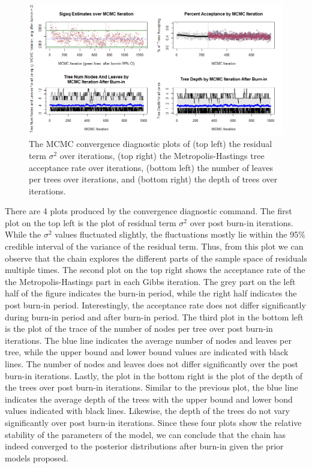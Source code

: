 \documentclass{usiinftr}
\begin{document}
\begin{figure}[h!] 
\centering
\includegraphics[width=\textwidth]{images/MCMC_convergence.png}
\caption{The MCMC convergence diagnostic plots of (top left) the residual term $\sigma^2$ over iterations, (top right) the Metropolis-Hastings tree acceptance rate over iterations, (bottom left) the number of leaves per trees over iterations, and (bottom right) the depth of trees over iterations.}
\label{MCMCConv}
\end{figure}

There are 4 plots produced by the convergence diagnostic command. The first plot on the top left is the plot of residual term $\sigma^2$ over post burn-in iterations. While the $\sigma^2$ values fluctuated slightly, the fluctuations mostly lie within the 95\% credible interval of the variance of the residual term. Thus, from this plot we can observe that the chain explores the different parts of the sample space of residuals multiple times. The second plot on the top right shows the acceptance rate of the the Metropolis-Hastings part in each Gibbs iteration. The grey part on the left half of the figure indicates the burn-in period, while the right half indicates the post burn-in period. Interestingly, the acceptance rate does not differ significantly during burn-in period and after burn-in period. The third plot in the bottom left is the plot of the trace of the number of nodes per tree over post burn-in iterations. The blue line indicates the average number of nodes and leaves per tree, while the upper bound and lower bound values are indicated with black lines. The number of nodes and leaves does not differ significantly over the post burn-in iterations. Lastly, the plot in the bottom right is the plot of the depth of the trees over post burn-in iterations. Similar to the previous plot, the blue line indicates the average depth of the trees with the upper bound and lower bond values indicated with black lines. Likewise, the depth of the trees do not vary significantly over post burn-in iterations. Since these four plots show the relative stability of the parameters of the model, we can conclude that the chain has indeed converged to the posterior distributions after burn-in given the prior models proposed.
\end{document}

